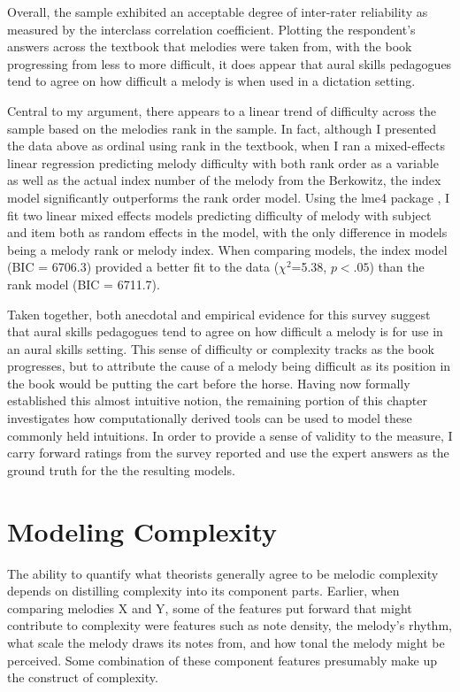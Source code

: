 \documentclass[12pt,]{book}
\begin{document}
Overall, the sample exhibited an acceptable degree of inter-rater reliability as measured by the interclass correlation coefficient.
Plotting the respondent's answers across the textbook that melodies were taken from, with the book progressing from less to more difficult, it does appear that aural skills pedagogues tend to agree on how difficult a melody is when used in a dictation setting.

Central to my argument, there appears to a linear trend of difficulty across the sample based on the melodies rank in the sample.
In fact, although I presented the data above as ordinal using rank in the textbook, when I ran a mixed-effects linear regression predicting melody difficulty with both rank order as a variable as well as the actual index number of the melody from the Berkowitz, the index model significantly outperforms the rank order model.
Using the lme4 package \citep{batesFittingLinearMixedEffects2015}, I fit two linear mixed effects models predicting difficulty of melody with subject and item both as random effects in the model, with the only difference in models being a melody rank or melody index.
When comparing models, the index model (BIC = 6706.3) provided a better fit to the data (\(\chi^2\)=5.38, \(p<.05\)) than the rank model (BIC = 6711.7).

Taken together, both anecdotal and empirical evidence for this survey suggest that aural skills pedagogues tend to agree on how difficult a melody is for use in an aural skills setting.
This sense of difficulty or complexity tracks as the book progresses, but to attribute the cause of a melody being difficult as its position in the book would be putting the cart before the horse.
Having now formally established this almost intuitive notion, the remaining portion of this chapter investigates how computationally derived tools can be used to model these commonly held intuitions.
In order to provide a sense of validity to the measure, I carry forward ratings from the survey reported and use the expert answers as the ground truth for the the resulting models.

\hypertarget{modeling-complexity}{%
\section{Modeling Complexity}\label{modeling-complexity}}

The ability to quantify what theorists generally agree to be melodic complexity depends on distilling complexity into its component parts.
Earlier, when comparing melodies X and Y, some of the features put forward that might contribute to complexity were features such as note density, the melody's rhythm, what scale the melody draws its notes from, and how tonal the melody might be perceived.
Some combination of these component features presumably make up the construct of complexity.
\end{document}
